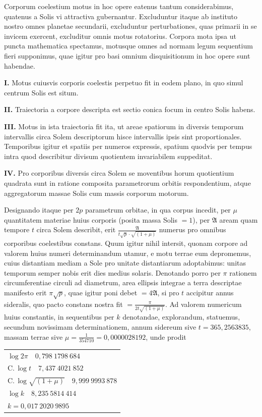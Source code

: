 \documentclass[12pt,a4paper]{book}
\newcommand{\Compl}{\mathrm{C.}\,}
\begin{document}
Corporum coelestium motus in hoc opere eatenus tantum considerabimus, quatenus a Solis vi attractiva gubernantur. Excluduntur itaque ab instituto nostro omnes planetae secundarii, excluduntur perturbationes, quas primarii in se invicem exercent, excluditur omnis motus rotatorius. Corpora mota ipsa ut puncta mathematica spectamus, motusque omnes ad normam legum sequentium fieri supponimus, quae igitur pro basi omnium disquisitionum in hoc opere sunt habendae.

\textbf{I.} Motus cuiusvis corporis coelestis perpetuo fit in eodem plano, in quo simul centrum Solis est situm.

\textbf{II.} Traiectoria a corpore descripta est sectio conica focum in centro Solis habens.

\textbf{III.} Motus in ista traiectoria fit ita, ut areae spatiorum in diversis temporum intervallis circa Solem descriptorum hisce intervallis ipsis sint proportionales. Temporibus igitur et spatiis per numeros expressis, spatium quodvis per tempus intra quod describitur divisum quotientem invariabilem suppeditat.

\textbf{IV.} Pro corporibus diversis circa Solem se moventibus horum quotientium quadrata sunt in ratione composita parametrorum orbitis respondentium, atque aggregatorum massae Solis cum massis corporum motorum.

Designando itaque per $2p$ parametrum orbitae, in qua corpus incedit, per $\mu$ quantitatem materiae huius corporis (posita massa Solis $=1$), per $\mathfrak{A}$ aream quam tempore $t$ circa Solem describit, erit $\frac{\mathfrak{A}}{t\sqrt{p}\cdot\sqrt{(1+\mu)}}$ numerus pro omnibus corporibus coelestibus constans. Quum igitur nihil intersit, quonam corpore ad valorem huius numeri determinandum utamur, e motu terrae eum depromemus, cuius distantiam mediam a Sole pro unitate distantiarum adoptabimus: unitas temporum semper nobis erit dies medius solaris. Denotando porro per $\pi$ rationem circumferentiae circuli ad diametrum, area ellipsis integrae a terra descriptae manifesto erit $\pi\sqrt{p}$, quae igitur poni debet $=4\mathfrak{A}$, si pro $t$ accipitur annus sideralis, quo pacto constans nostra fit $=\frac{\pi}{2t\sqrt{(1+\mu)}}$. Ad valorem numericum huius constantis, in sequentibus per $k$ denotandae, explorandum, statuemus, secundum novissimam determinationem, annum sidereum sive $t=365{,}2563835$, massam terrae sive $\mu=\frac{1}{354710}=0{,}0000028192$, unde prodit

\begin{center}
\begin{tabular}{@{}l@{}}
$\log 2\pi \quad 0{,}798\ 1798\ 684$ \\
$\Compl\log t \quad 7{,}437\ 4021\ 852$ \\
$\Compl\log\sqrt{(1+\mu)} \quad 9{,}999\ 9993\ 878$ \\[0.5ex]
$\log k \quad 8{,}235\ 5814\ 414$ \\[0.5ex]
$k = 0{,}017\ 2020\ 9895$
\end{tabular}
\end{center}
\end{document}
